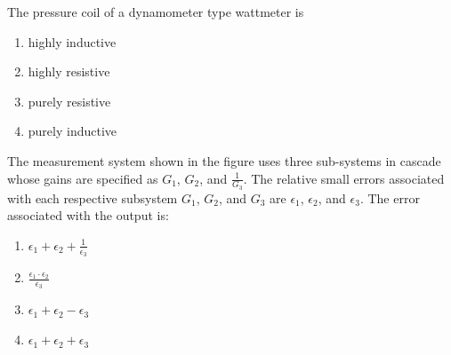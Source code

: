   \item The pressure coil of a dynamometer type wattmeter is  
\begin{enumerate}
\item highly inductive
\item highly resistive
\item purely resistive
\item purely inductive
\end{enumerate}

\item The measurement system shown in the figure uses three sub-systems in cascade whose gains are specified as $G_1$, $G_2$, and $\frac{1}{G_3}$. The relative small errors associated with each respective subsystem $G_1$, $G_2$, and $G_3$ are $\epsilon_1$, $\epsilon_2$, and $\epsilon_3$. The error associated with the output is:  
\begin{figure}[!ht]
    \centering
    
    \label{fig:my_label}
\end{figure}
\begin{enumerate}
\item $\epsilon_1 + \epsilon_2 + \frac{1}{\epsilon_3}$
\item $\frac{\epsilon_1 \cdot \epsilon_2}{\epsilon_3}$
\item $\epsilon_1 + \epsilon_2 - \epsilon_3$
\item $\epsilon_1 + \epsilon_2 + \epsilon_3$
\end{enumerate}

